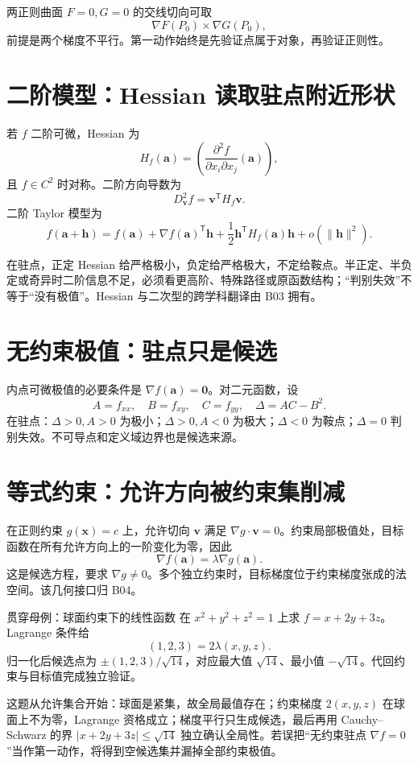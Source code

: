 \documentclass[11pt,a4paper,fontset=fandol]{ctexart}
\begin{document}
两正则曲面 $F=0,G=0$ 的交线切向可取
\[
\nabla F(P_0)\times\nabla G(P_0),
\]
前提是两个梯度不平行。第一动作始终是先验证点属于对象，再验证正则性。

\section{二阶模型：Hessian 读取驻点附近形状}

若 $f$ 二阶可微，Hessian 为
\[
H_f(\mathbf a)=\left(\frac{\partial^2f}{\partial x_i\partial x_j}(\mathbf a)\right),
\]
且 $f\in C^2$ 时对称。二阶方向导数为
\[
D_{\mathbf v}^2f=\mathbf v^{\mathsf T}H_f\mathbf v.
\]
二阶 Taylor 模型为
\[
f(\mathbf a+\mathbf h)
=f(\mathbf a)+{\nabla f(\mathbf a)}^{\mathsf T}\mathbf h
+\frac12\mathbf h^{\mathsf T}H_f(\mathbf a)\mathbf h
+o(\lVert\mathbf h\rVert^2).
\]

在驻点，正定 Hessian 给严格极小，负定给严格极大，不定给鞍点。半正定、半负定或奇异时二阶信息不足，必须看更高阶、特殊路径或原函数结构；“判别失效”不等于“没有极值”。Hessian 与二次型的跨学科翻译由 B03 拥有。

\section{无约束极值：驻点只是候选}

内点可微极值的必要条件是 $\nabla f(\mathbf a)=\mathbf0$。对二元函数，设
\[
A=f_{xx},\quad B=f_{xy},\quad C=f_{yy},\quad \Delta=AC-B^2.
\]
在驻点：$\Delta>0,A>0$ 为极小；$\Delta>0,A<0$ 为极大；$\Delta<0$ 为鞍点；$\Delta=0$ 判别失效。不可导点和定义域边界也是候选来源。

\section{等式约束：允许方向被约束集削减}

在正则约束 $g(\mathbf x)=c$ 上，允许切向 $\mathbf v$ 满足 $\nabla g\cdot\mathbf v=0$。约束局部极值处，目标函数在所有允许方向上的一阶变化为零，因此
\[
\boxed{\nabla f(\mathbf a)=\lambda\nabla g(\mathbf a)}.
\]
这是候选方程，要求 $\nabla g\ne0$。多个独立约束时，目标梯度位于约束梯度张成的法空间。该几何接口归 B04。

\begin{examplebox}{贯穿母例：球面约束下的线性函数}
在 $x^2+y^2+z^2=1$ 上求 $f=x+2y+3z$。Lagrange 条件给
\[
(1,2,3)=2\lambda(x,y,z).
\]
归一化后候选点为 $\pm(1,2,3)/\sqrt{14}$，对应最大值 $\sqrt{14}$、最小值 $-\sqrt{14}$。代回约束与目标值完成独立验证。

这题从允许集合开始：球面是紧集，故全局最值存在；约束梯度 $2(x,y,z)$ 在球面上不为零，Lagrange 资格成立；梯度平行只生成候选，最后再用 Cauchy--Schwarz 的界
$|x+2y+3z|\le\sqrt{14}$ 独立确认全局性。若误把“无约束驻点 $\nabla f=0$”当作第一动作，将得到空候选集并漏掉全部约束极值。
\end{examplebox}
\end{document}
